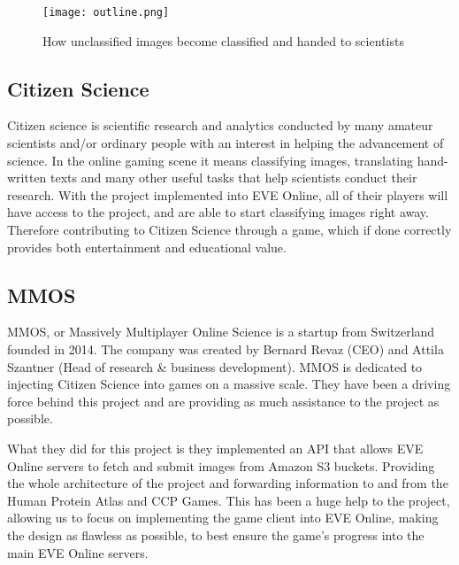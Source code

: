 \begin{figure}[H]
	\centering
	\graphicspath{ {./graphics/} }
    \centerline{\texttt{[image: outline.png]}}
    \caption{\label{fig:outline}How unclassified images become classified and handed to scientists}
\end{figure}

\subsection{Citizen Science}
Citizen science is scientific research and analytics conducted by many amateur scientists and/or ordinary people with an interest in helping the advancement of science. In the online gaming scene it means classifying images, translating hand-written texts and many other useful tasks that help scientists conduct their research. With the project implemented into EVE Online, all of their players will have access to the project, and are able to start classifying images right away. Therefore contributing to Citizen Science through a game, which if done correctly provides both entertainment and educational value.

\subsection{MMOS}
MMOS, or Massively Multiplayer Online Science is a startup from Switzerland founded in 2014. The company was created by Bernard Revaz (CEO) and Attila Szantner (Head of research \& business development). MMOS is dedicated to injecting Citizen Science into games on a massive scale. They have been a driving force behind this project and are providing as much assistance to the project as possible. 

What they did for this project is they implemented an API that allows EVE Online servers to fetch and submit images from Amazon S3 buckets. Providing the whole architecture of the project and forwarding information to and from the Human Protein Atlas and CCP Games. This has been a huge help to the project, allowing us to focus on implementing the game client into EVE Online, making the design as flawless as possible, to best ensure the game's progress into the main EVE Online servers.